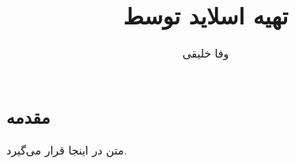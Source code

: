 \documentclass{beamer}
\title{تهیه اسلاید توسط \eng{\XePersian}}
\author{وفا خلیقی}
\begin{document}
\maths
\begin{farsi}
\frame{\maketitle}
\section{مقدمه}
\begin{frame}

متن در اینجا قرار می‌گیرد.

\end{frame}
\end{farsi}
\end{document}
